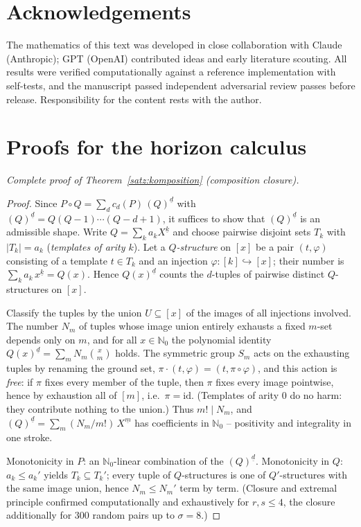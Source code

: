 \documentclass[11pt]{article}
\theoremstyle{definition}
\theoremstyle{remark}
\newcommand{\NN}{\mathbb N_0}
\newcommand{\ff}[2]{#1^{\underline{#2}}}
\begin{document}
\section*{Acknowledgements}
The mathematics of this text was developed in close collaboration
with Claude (Anthropic); GPT (OpenAI) contributed ideas and early
literature scouting. All results were verified computationally
against a reference implementation with self-tests, and the
manuscript passed independent adversarial review passes before
release. Responsibility for the content rests with the author.

\appendix

\section{Proofs for the horizon calculus}\label{app:calc}

\emph{Complete proof of Theorem~\ref{satz:komposition}
(composition closure).}

\begin{proof}
Since $P\circ Q=\sum_d c_d(P)\,(Q)^{\underline d}$ with
$(Q)^{\underline d}=Q(Q{-}1)\cdots(Q{-}d{+}1)$, it suffices to
show that $(Q)^{\underline d}$ is an admissible shape. Write
$Q=\sum_k a_k\ff Xk$ and choose pairwise disjoint sets $T_k$ with
$|T_k|=a_k$ (\emph{templates of arity $k$}). Let a
\emph{$Q$-structure} on $[x]$ be a pair $(t,\varphi)$ consisting
of a template $t\in T_k$ and an injection
$\varphi\colon[k]\hookrightarrow[x]$; their number is
$\sum_k a_k\,\ff xk=Q(x)$. Hence $Q(x)^{\underline d}$ counts the
$d$-tuples of pairwise distinct $Q$-structures on $[x]$.

Classify the tuples by the union $U\subseteq[x]$ of the images of
all injections involved. The number $N_m$ of tuples whose image
union entirely exhausts a fixed $m$-set depends only on $m$, and
for all $x\in\NN$ the polynomial identity
$Q(x)^{\underline d}=\sum_m N_m\binom xm$ holds. The symmetric
group $S_m$ acts on the exhausting tuples by renaming the ground
set, $\pi\cdot(t,\varphi)=(t,\pi\circ\varphi)$, and this action is
\emph{free}: if $\pi$ fixes every member of the tuple, then $\pi$
fixes every image pointwise, hence by exhaustion all of $[m]$,
i.e.\ $\pi=\mathrm{id}$. (Templates of arity 0 do no harm: they
contribute nothing to the union.) Thus $m!\mid N_m$, and
$(Q)^{\underline d}=\sum_m(N_m/m!)\,\ff Xm$ has coefficients in
$\NN$ -- positivity and integrality in one stroke.

Monotonicity in $P$: an $\NN$-linear combination of the
$(Q)^{\underline d}$. Monotonicity in $Q$: $a_k\le a_k'$ yields
$T_k\subseteq T_k'$; every tuple of $Q$-structures is one of
$Q'$-structures with the same image union, hence $N_m\le N_m'$
term by term. (Closure and extremal principle confirmed
computationally and exhaustively for $r,s\le4$, the closure
additionally for 300 random pairs up to $\sigma=8$.)
\end{proof}
\end{document}
